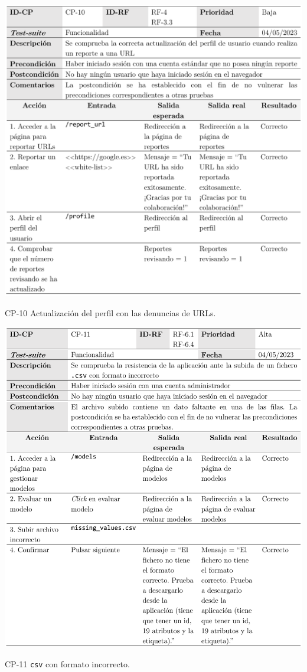 \begin{table}[p]
	\centering
	\includegraphics[width=\textwidth]{../img/anexos/cp/CP-10}
	\caption{CP-10 Actualización del perfil con las denuncias de URLs.}
	\label{cp:report-url}
\end{table}

\begin{table}[p]
	\centering
	\includegraphics[width=\textwidth]{../img/anexos/cp/CP-11}
	\caption{CP-11 \texttt{csv} con formato incorrecto.}
	\label{cp:wrong-csv}
\end{table}

